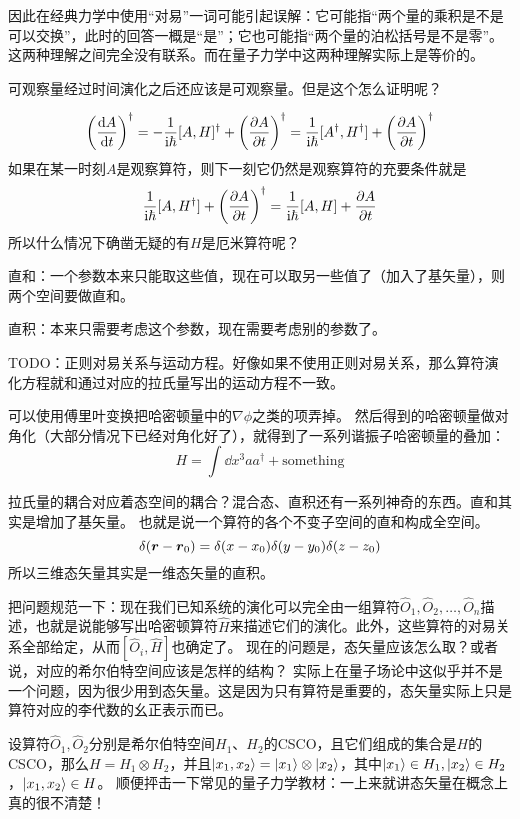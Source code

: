 \documentclass[UTF8, a4paper]{ctexart}
\newcommand*{\ii}{\mathrm{i}}
\begin{document}
因此在经典力学中使用“对易”一词可能引起误解：它可能指“两个量的乘积是不是可以交换”，此时的回答一概是“是”；它也可能指“两个量的泊松括号是不是零”。这两种理解之间完全没有联系。而在量子力学中这两种理解实际上是等价的。

可观察量经过时间演化之后还应该是可观察量。但是这个怎么证明呢？

\[
    \left(\dv{A}{t}\right)^\dagger = - \frac{1}{\ii \hbar} [A, H]^\dagger + \left(\pdv{A}{t}\right)^\dagger = \frac{1}{\ii \hbar} [A^\dagger, H^\dagger] + \left(\pdv{A}{t}\right)^\dagger
\]
如果在某一时刻$A$是观察算符，则下一刻它仍然是观察算符的充要条件就是
\[
    \frac{1}{\ii \hbar} [A, H^\dagger] + \left(\pdv{A}{t}\right)^\dagger = \frac{1}{\ii \hbar} [A, H] + \pdv{A}{t}
\]
所以什么情况下确凿无疑的有$H$是厄米算符呢？

直和：一个参数本来只能取这些值，现在可以取另一些值了（加入了基矢量），则两个空间要做直和。

直积：本来只需要考虑这个参数，现在需要考虑别的参数了。

TODO：正则对易关系与运动方程。好像如果不使用正则对易关系，那么算符演化方程就和通过对应的拉氏量写出的运动方程不一致。

可以使用傅里叶变换把哈密顿量中的$\nabla \phi$之类的项弄掉。
然后得到的哈密顿量做对角化（大部分情况下已经对角化好了），就得到了一系列谐振子哈密顿量的叠加：
\[
    H = \int \dd x^3 a a^\dagger + \text{something}
\]

拉氏量的耦合对应着态空间的耦合？混合态、直积还有一系列神奇的东西。直和其实是增加了基矢量。
也就是说一个算符的各个不变子空间的直和构成全空间。
\[
    \delta(\vb*{r} - \vb*{r}_0) = \delta(x - x_0) \delta(y - y_0) \delta(z - z_0)
\]
所以三维态矢量其实是一维态矢量的直积。

把问题规范一下：现在我们已知系统的演化可以完全由一组算符$\hat{O}_1, \hat{O}_2, \ldots, \hat{O}_n$描述，也就是说能够写出哈密顿算符$\hat{H}$来描述它们的演化。此外，这些算符的对易关系全部给定，从而$[\hat{O}_i, \hat{H}]$也确定了。
现在的问题是，态矢量应该怎么取？或者说，对应的希尔伯特空间应该是怎样的结构？
实际上在量子场论中这似乎并不是一个问题，因为很少用到态矢量。这是因为只有算符是重要的，态矢量实际上只是算符对应的李代数的幺正表示而已。

设算符$\hat{O}_1, \hat{O}_2$分别是希尔伯特空间$H_1$、$H_2$的CSCO，且它们组成的集合是$H$的CSCO，那么$H = H_1 \otimes H_2$，并且$\ket{x_1, x_2} = \ket{x_1} \otimes \ket{x_2}$，其中$\ket{x_1} \in H_1, \ket{x_2} \in H_2$，$\ket{x_1, x_2} \in H$。
顺便抨击一下常见的量子力学教材：一上来就讲态矢量在概念上真的很不清楚！
\end{document}
